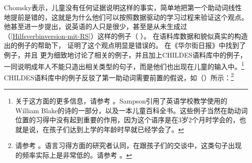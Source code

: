 \zl
Chomsky表示，儿童没有任何证据说明这样的事实，简单地把第一个助动词线性地提前是错的，这就是为什么他们可以按照数据驱动的学习过程来验证这个观点。他甚至进一步提出，说英语的人只是很少，甚至是从未生成过（\ref{Hilfsverbinversion-mit-RS}）这样的例子（ ）。
在语料库数据和貌似真实的构造出的例子的帮助下， \citet{Pullum96a}证明了这个观点明显是错误的。
  \citet{Pullum96a}在《华尔街日报》中找到了例子，并且 \citet{PS2002a}更为细致地讨论了相关的例子，并且加上CHILDES语料库中的例子，一同说明成年人不能只造出相关类型的句子，而是他们也出现在儿童的输入中。\footnote{%
 关于这方面的更多信息，请参考 。Sampson引用了英语学校教学使用的William Blake的诗的一部分，以及一本儿童百科全书。这些例子当然在助动词位置的习得中没有起到重要的作用，因为这个语序是在3岁2个月时学会的，也就是说，在孩子们达到上学的年龄时早就已经学会了。
 }
CHILDES语料库中的例子反驳了第一助动词需要前置的假说，如（）所示：\footnote{%
请参考 。语言习得方面的研究者认同，在跟孩子们的交谈中，这类句子出现的频率实际上是非常低的。请参考 。
 }
